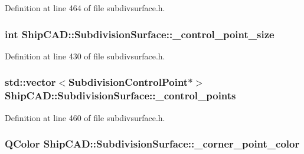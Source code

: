 Definition at line 464 of file subdivsurface.\+h.

\subsubsection[{\texorpdfstring{\+\_\+control\+\_\+point\+\_\+size}{_control_point_size}}]{\setlength{\rightskip}{0pt plus 5cm}int Ship\+C\+A\+D\+::\+Subdivision\+Surface\+::\+\_\+control\+\_\+point\+\_\+size\hspace{0.3cm}{\ttfamily [protected]}}\hypertarget{classShipCAD_1_1SubdivisionSurface_a7ad820b9d312c8ecde939b5345690d35}{}\label{classShipCAD_1_1SubdivisionSurface_a7ad820b9d312c8ecde939b5345690d35}


Definition at line 430 of file subdivsurface.\+h.

\subsubsection[{\texorpdfstring{\+\_\+control\+\_\+points}{_control_points}}]{\setlength{\rightskip}{0pt plus 5cm}std\+::vector$<${\bf Subdivision\+Control\+Point}$\ast$$>$ Ship\+C\+A\+D\+::\+Subdivision\+Surface\+::\+\_\+control\+\_\+points\hspace{0.3cm}{\ttfamily [protected]}}\hypertarget{classShipCAD_1_1SubdivisionSurface_a906d5981dc482ede1bb3c7256e750945}{}\label{classShipCAD_1_1SubdivisionSurface_a906d5981dc482ede1bb3c7256e750945}


Definition at line 460 of file subdivsurface.\+h.

\subsubsection[{\texorpdfstring{\+\_\+corner\+\_\+point\+\_\+color}{_corner_point_color}}]{\setlength{\rightskip}{0pt plus 5cm}Q\+Color Ship\+C\+A\+D\+::\+Subdivision\+Surface\+::\+\_\+corner\+\_\+point\+\_\+color\hspace{0.3cm}{\ttfamily [protected]}}\hypertarget{classShipCAD_1_1SubdivisionSurface_aba9fae36ed19b802707c748396c1fd63}{}\label{classShipCAD_1_1SubdivisionSurface_aba9fae36ed19b802707c748396c1fd63}


